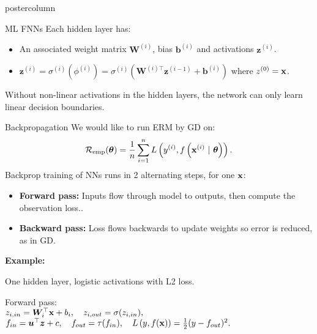 \documentclass{beamer}
\begin{document}
\begin{frame}[fragile]{}
\begin{columns}
\begin{column}{.31\textwidth}
\begin{beamercolorbox}[center]{postercolumn}
\begin{minipage}{.98\textwidth}
{\begin{myblock}{ML FNNs}
  Each hidden layer has:
  \begin{itemize}[$\bullet$]
  \setlength{\itemindent}{+.3in}
  \item An associated weight matrix $\bm{W}^{(i)}$, bias $\bm{b}^{(i)}$ and activations $\bm{z}^{(i)}$.
  \item $\bm{z}^{(i)} = \sigma^{(i)}(\phi^{(i)}) = \sigma^{(i)}(\bm{W}^{(i)\top} \bm{z}^{(i-1)}+\bm{b}^{(i)})$ where $z^{(0)}=\mathbf{x}$.
  \end{itemize}

  Without non-linear activations in the hidden layers, the network can only learn linear decision boundaries.

 
  \end{myblock}
  
  \begin{myblock}{Backpropagation}
    We would like to run ERM by GD on: $$\mathcal{R}_{\text{emp}}(\bm{\theta}) = \frac{1}{n} \sum\limits_{i=1}^nL\left(y^{(i)}, f\left(\mathbf{x}^{(i)} ~|~ \bm{\theta}\right)\right).$$
    Backprop training of NNs runs in 2 alternating steps, for one $\mathbf{x}$:
    \begin{itemize}[$\bullet$]
      \setlength{\itemindent}{+.3in}
      \item \textbf{Forward pass:} Inputs flow through model to outputs, then compute the observation loss..
      \item \textbf{Backward pass:} Loss flows backwards to update weights so error is reduced, as in GD.
      \end{itemize}

  \begin{codebox} 
  \textbf{Example:}
  \end{codebox}
  One hidden layer, logistic activations with L2 loss.

  Forward pass:\\
  $z_{i,in} = \bm{W}_i^\top \mathbf{x}+b_i, \quad z_{i,out} = \sigma(z_{i,in}),$\\
  $f_{in} = \bm{u}^\top\bm{z}+c, \quad f_{out} = \tau(f_{in}), \quad L\left(y, f(\mathbf{x})\right) = \frac{1}{2}(y-f_{out})^2.$


\end{myblock}}
\end{minipage}
\end{beamercolorbox}
\end{column}
\end{columns}
\end{frame}
\end{document}
